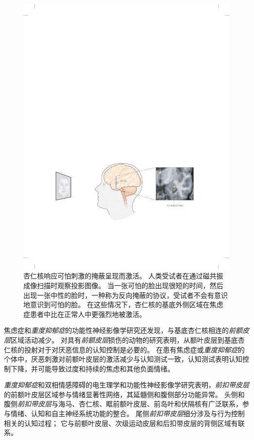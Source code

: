 \begin{figure}[htbp]
	\centering
	\includegraphics[width=1.0\linewidth]{chap61/fig_61_3}
	\caption{杏仁核响应可怕刺激的掩蔽呈现而激活。
		人类受试者在通过磁共振成像扫描时观察投影图像。
		当一张可怕的脸出现很短的时间，然后出现一张中性的脸时，一种称为反向掩蔽的协议，受试者不会有意识地意识到可怕的脸。
		在这些情况下，杏仁核的基底外侧区域在焦虑症患者中比在正常人中更强烈地被激活\cite{etkin2004individual}。}
	\label{fig:61_3}
\end{figure}


焦虑症和\textit{重度抑郁症}的功能性神经影像学研究还发现，与基底杏仁核相连的\textit{前额皮层}区域活动减少。
对具有\textit{前额皮层}损伤的动物的研究表明，从额叶皮层到基底杏仁核的投射对于对厌恶信息的认知控制是必要的。
在患有焦虑症或\textit{重度抑郁症}的个体中，厌恶刺激对前额叶皮层的激活减少与认知测试一致，认知测试表明认知控制下降，并可能导致过度和持续的焦虑和其他负面情绪。


\textit{重度抑郁症}和双相情感障碍的电生理学和功能性神经影像学研究表明，\textit{前扣带皮层}的前额叶皮层区域参与情绪显著性网络，其延髓侧和腹侧部分功能异常。
头侧和腹侧\textit{前扣带皮层}与海马、杏仁核、眶前额叶皮层、前岛叶和伏隔核有广泛联系，参与情绪、认知和自主神经系统功能的整合。
尾侧\textit{前扣带皮层}细分涉及与行为控制相关的认知过程；
它与前额叶皮层、次级运动皮层和后扣带皮层的背侧区域有联系。


